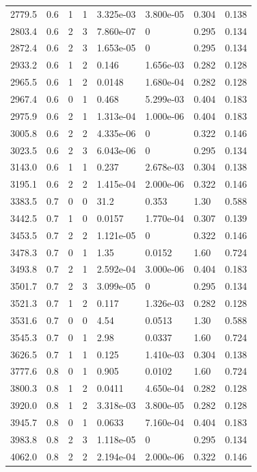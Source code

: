 \documentclass[preview]{standalone}
\begin{document}
{{{\begin{tabular}{L{1.2cm}C{1.2cm} C{0.3cm}C{0.5cm} C{1.4cm}C{1.4cm} C{1.4cm}C{1.4cm}}
  2779.5  &   0.6  & 1     &  1 &  3.325e-03  & 3.800e-05  & 0.304 &  0.138   \\ 
  2803.4  &   0.6  & 2     &  3 &  7.860e-07  & 0  & 0.295 &  0.134   \\ 
  2872.4  &   0.6  & 2     &  3 &  1.653e-05  & 0  & 0.295 &  0.134   \\ 
  2933.2  &   0.6  & 1     &  2 &  0.146  & 1.656e-03  & 0.282 &  0.128   \\ 
  2965.5  &   0.6  & 1     &  2 &  0.0148  & 1.680e-04  & 0.282 &  0.128   \\ 
  2967.4  &   0.6  & 0     &  1 &  0.468  & 5.299e-03  & 0.404 &  0.183   \\ 
  2975.9  &   0.6  & 2     &  1 &  1.313e-04  & 1.000e-06  & 0.404 &  0.183   \\ 
  3005.8  &   0.6  & 2     &  2 &  4.335e-06  & 0  & 0.322 &  0.146   \\ 
  3023.5  &   0.6  & 2     &  3 &  6.043e-06  & 0  & 0.295 &  0.134   \\ 
  3143.0  &   0.6  & 1     &  1 &  0.237  & 2.678e-03  & 0.304 &  0.138   \\ 
  3195.1  &   0.6  & 2     &  2 &  1.415e-04  & 2.000e-06  & 0.322 &  0.146   \\ 
  3383.5  &   0.7  & 0     &  0 &  31.2  & 0.353  & 1.30 &  0.588   \\ 
  3442.5  &   0.7  & 1     &  0 &  0.0157  & 1.770e-04  & 0.307 &  0.139   \\ 
  3453.5  &   0.7  & 2     &  2 &  1.121e-05  & 0  & 0.322 &  0.146   \\ 
  3478.3  &   0.7  & 0     &  1 &  1.35  & 0.0152  & 1.60 &  0.724   \\ 
  3493.8  &   0.7  & 2     &  1 &  2.592e-04  & 3.000e-06  & 0.404 &  0.183   \\ 
  3501.7  &   0.7  & 2     &  3 &  3.099e-05  & 0  & 0.295 &  0.134   \\ 
  3521.3  &   0.7  & 1     &  2 &  0.117  & 1.326e-03  & 0.282 &  0.128   \\ 
  3531.6  &   0.7  & 0     &  0 &  4.54  & 0.0513  & 1.30 &  0.588   \\ 
  3545.3  &   0.7  & 0     &  1 &  2.98  & 0.0337  & 1.60 &  0.724   \\ 
  3626.5  &   0.7  & 1     &  1 &  0.125  & 1.410e-03  & 0.304 &  0.138   \\ 
  3777.6  &   0.8  & 0     &  1 &  0.905  & 0.0102  & 1.60 &  0.724   \\ 
  3800.3  &   0.8  & 1     &  2 &  0.0411  & 4.650e-04  & 0.282 &  0.128   \\ 
  3920.0  &   0.8  & 1     &  2 &  3.318e-03  & 3.800e-05  & 0.282 &  0.128   \\ 
  3945.7  &   0.8  & 0     &  1 &  0.0633  & 7.160e-04  & 0.404 &  0.183   \\ 
  3983.8  &   0.8  & 2     &  3 &  1.118e-05  & 0  & 0.295 &  0.134   \\ 
  4062.0  &   0.8  & 2     &  2 &  2.194e-04  & 2.000e-06  & 0.322 &  0.146   \\ 
\hline 
\end{tabular} 

}}}
\end{document}
